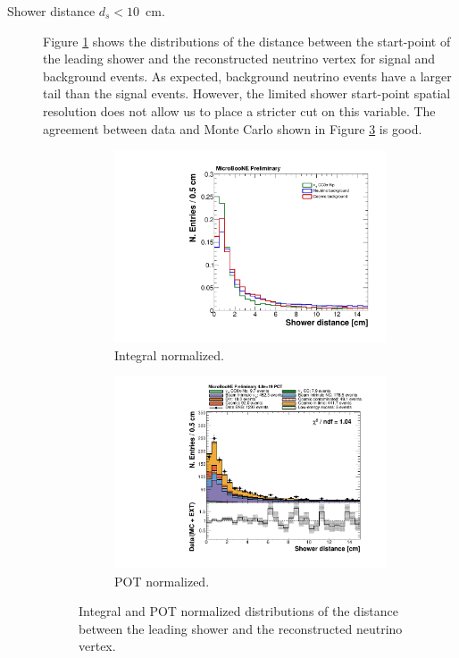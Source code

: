 \begin{description}
\item[Shower distance $d_{s} < 10$~cm.] Figure \ref{fig:shower_norm} shows the distributions of the distance between the start-point of the leading shower and the reconstructed neutrino vertex for signal and background events. As expected, background neutrino events have a larger tail than the signal events. However, the limited shower start-point spatial resolution does not allow us to place a stricter cut on this variable. The agreement between data and Monte Carlo shown in Figure \ref{fig:shower_pot} is good.

\begin{figure}[htbp]
\centering
  \begin{subfigure}{0.45\textwidth}
    \includegraphics[width=\linewidth]{figures/h_shower_distance_norm.pdf}
    \caption{Integral normalized.} \label{fig:shower_norm}
  \end{subfigure}
    \begin{subfigure}{0.45\textwidth}
    \includegraphics[width=\linewidth]{figures/h_shower_distance.pdf}
    \caption{POT normalized.} \label{fig:shower_pot}
  \end{subfigure}
  \caption{Integral and POT normalized distributions of the distance between the leading shower and the reconstructed neutrino vertex.}
\end{figure}


\end{description}
